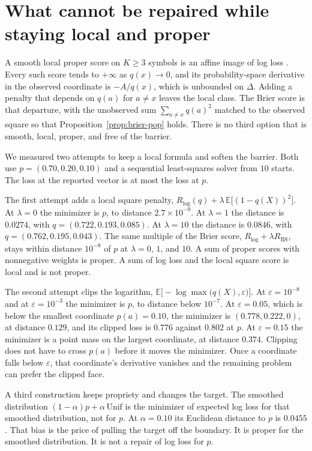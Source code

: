 \documentclass[10pt]{article}
\newcommand{\BS}{\mathrm{BS}}
\begin{document}
\section{What cannot be repaired while staying local and proper}
\label{sec:repair}

A smooth local proper score on $K\ge 3$ symbols is an affine image of log loss \citep{bernardo1979,mit67800}.
Every such score tends to $+\infty$ as $q(x)\to 0$, and its probability-space derivative in the observed coordinate is $-A/q(x)$, which is unbounded on $\Delta$.
Adding a penalty that depends on $q(a)$ for $a\neq x$ leaves the local class.
The Brier score is that departure, with the unobserved sum $\sum_{a\neq x} q(a)^2$ matched to the observed square so that Proposition~\ref{prop:brier-pop} holds.
There is no third option that is smooth, local, proper, and free of the barrier.

We measured two attempts to keep a local formula and soften the barrier.
Both use $p=(0.70,0.20,0.10)$ and a sequential least-squares solver from $10$ starts.
The loss at the reported vector is at most the loss at $p$.

The first attempt adds a local square penalty, $R_{\log}(q)+\lambda\, \mathbb{E}\bigl[(1-q(X))^2\bigr]$.
At $\lambda=0$ the minimizer is $p$, to distance $2.7\times 10^{-9}$.
At $\lambda=1$ the distance is $0.0274$, with $q=(0.722,0.193,0.085)$.
At $\lambda=10$ the distance is $0.0846$, with $q=(0.762,0.195,0.043)$.
The same multiple of the Brier score, $R_{\log}+\lambda R_{\BS}$, stays within distance $10^{-8}$ of $p$ at $\lambda=0$, $1$, and $10$.
A sum of proper scores with nonnegative weights is proper.
A sum of log loss and the local square score is local and is not proper.

The second attempt clips the logarithm, $\mathbb{E}\bigl[-\log\max\bigl(q(X),\varepsilon\bigr)\bigr]$.
At $\varepsilon=10^{-8}$ and at $\varepsilon=10^{-3}$ the minimizer is $p$, to distance below $10^{-7}$.
At $\varepsilon=0.05$, which is below the smallest coordinate $p(a)=0.10$, the minimizer is $(0.778,0.222,0)$, at distance $0.129$, and its clipped loss is $0.776$ against $0.802$ at $p$.
At $\varepsilon=0.15$ the minimizer is a point mass on the largest coordinate, at distance $0.374$.
Clipping does not have to cross $p(a)$ before it moves the minimizer.
Once a coordinate falls below $\varepsilon$, that coordinate's derivative vanishes and the remaining problem can prefer the clipped face.

A third construction keeps propriety and changes the target.
The smoothed distribution $(1-\alpha)p+\alpha\,\mathrm{Unif}$ is the minimizer of expected log loss for that smoothed distribution, not for $p$.
At $\alpha=0.10$ its Euclidean distance to $p$ is $0.0455$.
That bias is the price of pulling the target off the boundary.
It is proper for the smoothed distribution.
It is not a repair of log loss for $p$.
\end{document}
